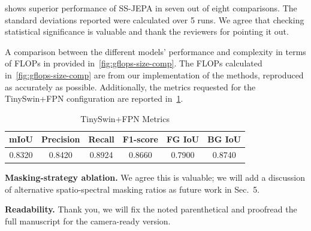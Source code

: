  shows superior performance of SS-JEPA in seven out of eight comparisons. The standard deviations reported were calculated over 5 runs. We agree that checking statistical significance is valuable and thank the reviewers for pointing it out.

A comparison between the different models' performance and complexity in terms of FLOPs in provided in~\cref{fig:gflops-size-comp}. The FLOPs calculated in~\cref{fig:gflops-size-comp} are from our implementation of the methods, reproduced as accurately as possible. Additionally, the metrics requested for the TinySwin+FPN configuration are reported in~\cref{tab:tinyswin}.

\begin{table}
	\caption{TinySwin+FPN Metrics}\label{tab:tinyswin}
	\vspace{-1.5em}
	\begin{center}
		\scriptsize{}
		\begin{tabular}{cccccc}
			\toprule
			\textbf{mIoU} & \textbf{Precision} & \textbf{Recall} & \textbf{F1-score} & \textbf{FG IoU} & \textbf{BG IoU} \\

			\midrule
			0.8320        & 0.8420             & 0.8924          & 0.8660            & 0.7900          & 0.8740          \\
			\bottomrule
		\end{tabular}
	\end{center}
	\vspace{-1.9em}
\end{table}

\noindent\textbf{Masking-strategy ablation.} We agree this is valuable; we
will add a discussion of alternative spatio-spectral masking ratios as future
work in Sec.~5.

\noindent\textbf{Readability.} Thank you, we will fix the noted
parenthetical and proofread the full manuscript for the camera-ready version.

